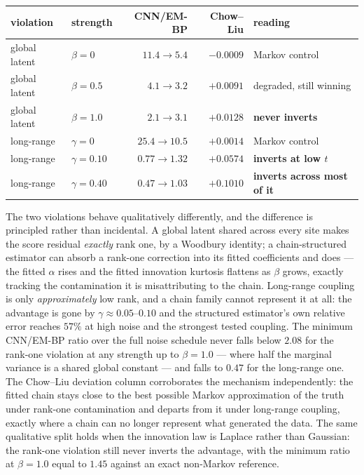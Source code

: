 \begin{center}
\small
\begin{tabular}{@{}llrrl@{}}
\toprule
violation & strength & CNN/EM-BP & Chow--Liu & reading \\
\midrule
global latent & $\beta=0$     & $11.4\to5.4$      & $-0.0009$ & Markov control \\
global latent & $\beta=0.5$   & $4.1\to3.2$       & $+0.0091$ & degraded, still winning \\
global latent & $\beta=1.0$   & $2.1\to3.1$       & $+0.0128$ & \textbf{never inverts} \\
long-range    & $\gamma=0$    & $25.4\to10.5$     & $+0.0014$ & Markov control \\
long-range    & $\gamma=0.10$ & $0.77\to1.32$     & $+0.0574$ & \textbf{inverts at low $t$} \\
long-range    & $\gamma=0.40$ & $0.47\to1.03$     & $+0.1010$ & \textbf{inverts across most of it} \\
\bottomrule
\end{tabular}
\end{center}
\noindent The two violations behave qualitatively differently, and the
difference is principled rather than incidental. A global latent shared
across every site makes the score residual \emph{exactly} rank one, by a
Woodbury identity; a chain-structured estimator can absorb a rank-one
correction into its fitted coefficients and does --- the fitted $\alpha$
rises and the fitted innovation kurtosis flattens as $\beta$ grows, exactly
tracking the contamination it is misattributing to the chain. Long-range
coupling is only \emph{approximately} low rank, and a chain family cannot
represent it at all: the advantage is gone by $\gamma\approx0.05$--$0.10$ and
the structured estimator's own relative error reaches $57\%$ at high noise
and the strongest tested coupling. The minimum CNN/EM-BP ratio over the full
noise schedule never falls below $2.08$ for the rank-one violation at any
strength up to $\beta=1.0$ --- where half the marginal variance is a shared
global constant --- and falls to $0.47$ for the long-range one. The Chow--Liu
deviation column corroborates the mechanism independently: the fitted chain
stays close to the best possible Markov approximation of the truth under
rank-one contamination and departs from it under long-range coupling,
exactly where a chain can no longer represent what generated the data. The
same qualitative split holds when the innovation law is Laplace rather than
Gaussian: the rank-one violation still never inverts the advantage, with the
minimum ratio at $\beta=1.0$ equal to $1.45$ against an exact non-Markov
reference.

